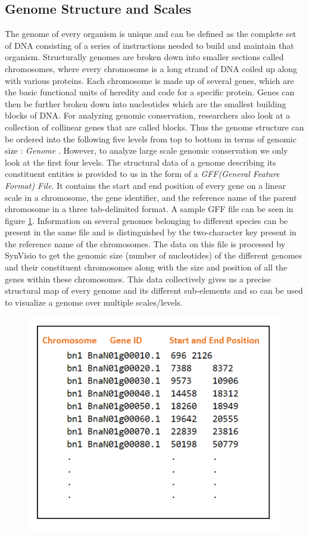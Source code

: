 \subsection{Genome Structure and Scales}
The genome of every organism is unique and can be defined as the complete set of DNA consisting of a series of instructions needed to build and maintain that organism. Structurally genomes are broken down into smaller sections called chromosomes, where every chromosome is a long strand of DNA coiled up along with various proteins. Each chromosome is made up of several genes, which are the basic functional units of heredity and code for a specific protein. Genes can then be further broken down into nucleotides which are the smallest building blocks of DNA. For analyzing genomic conservation, researchers also look at a collection of collinear genes that are called blocks. Thus the genome structure can be ordered into the following five levels from top to bottom in terms of genomic size : \textit{Genome }. However, to analyze large scale genomic conservation we only look at the first four levels. The structural data of a genome describing its constituent entities is provided to us in the form of a \textit{GFF(General Feature Format) File}. It contains the start and end position of every gene on a linear scale in a chromosome, the gene identifier, and the reference name of the parent chromosome in a three tab-delimited format. A sample GFF file can be seen in figure \ref{fig:ch_3_gff_file}.  Information on several genomes belonging to different species can be present in the same file and is distinguished by the two-character key present in the reference name of the chromosomes. The data on this file is processed by SynVisio to get the genomic size (number of nucleotides) of the different genomes and their constituent chromosomes along with the size and position of all the genes within these chromosomes. This data collectively gives us a precise structural map of every genome and its different sub-elements and so can be used to visualize a genome over multiple scales/levels.

\begin{figure}
  \centering
  \includegraphics[width=.55\linewidth]{images/ch_3_gff_file.PNG}
  \label{fig:ch_3_gff_file}
\end{figure}


